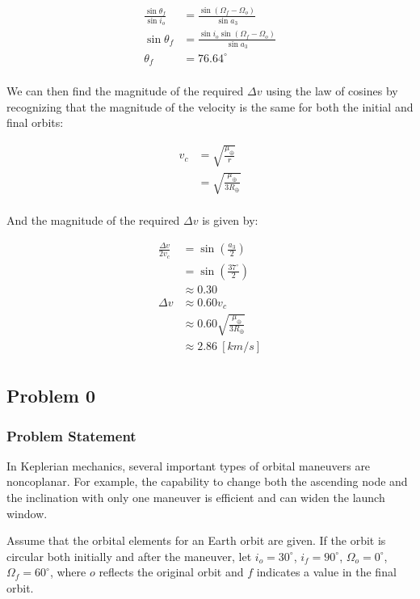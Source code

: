 \begin{align*}
    \frac{\sin\theta_f}{\sin i_o} &= \frac{\sin(\Omega_f - \Omega_o)}{\sin a_3} \\
    \sin\theta_f &= \frac{\sin i_o \sin(\Omega_f - \Omega_o)}{\sin a_3} \\
    \theta_f &= 76.64^\circ \\
\end{align*}

We can then find the magnitude of the required $\Delta v$ using the law of cosines by recognizing that the magnitude of the velocity is the same for both the initial and final orbits:

\begin{align*}
    v_c &= \sqrt{\frac{\mu_\oplus}{r}} \\
    &= \sqrt{\frac{\mu_\oplus}{3R_\oplus}} \\
\end{align*}

And the magnitude of the required $\Delta v$ is given by:

\begin{align*}
    \frac{\Delta v}{2 v_c} &= \sin\left( \frac{a_3}{2} \right) \\
    &= \sin\left( \frac{37^\circ}{2} \right) \\
    &\approx 0.30 \\
    \Delta v &\approx 0.60 v_c \\
    &\approx 0.60 \sqrt{\frac{\mu_\oplus}{3R_\oplus}} \\
    &\approx 2.86 \: [km/s] \\
\end{align*}

\subsection{Problem 0}

\subsubsection{Problem Statement}

In Keplerian mechanics, several important types of orbital maneuvers are noncoplanar. For example, the capability to change both the ascending node and the inclination with only one maneuver is efficient and can widen the launch window.

Assume that the orbital elements for an Earth orbit are given. If the orbit is circular both initially and after the maneuver, let $i_o=30^\circ$, $i_f=90^\circ$, $\Omega_o=0^\circ$, $\Omega_f=60^\circ$, where $o$ reflects the original orbit and $f$ indicates a value in the final orbit.


